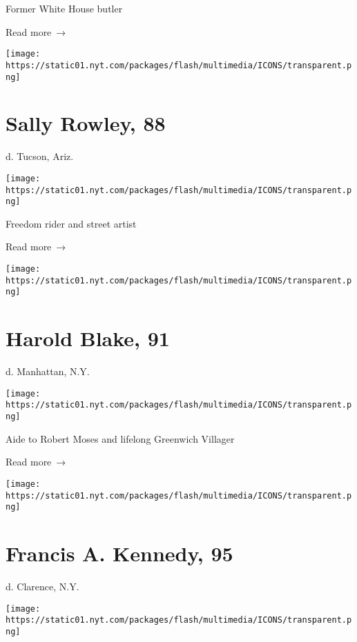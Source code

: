 Former White House butler

 Read more~→

\href{https://www.nytimes.com/2020/05/21/obituaries/sally-rowley-dead-coronavirus.html}{}

\texttt{[image: https://static01.nyt.com/packages/flash/multimedia/ICONS/transparent.png]}

\hypertarget{sally-rowley-88}{%
\section{Sally Rowley, 88}\label{sally-rowley-88}}

d. Tucson, Ariz.

\texttt{[image: https://static01.nyt.com/packages/flash/multimedia/ICONS/transparent.png]}

Freedom rider and street artist

 Read more~→

\href{https://www.nytimes.com/2020/05/21/nyregion/harold-blake-dead-coronavirus.html}{}

\texttt{[image: https://static01.nyt.com/packages/flash/multimedia/ICONS/transparent.png]}

\hypertarget{harold-blake-91}{%
\section{Harold Blake, 91}\label{harold-blake-91}}

d. Manhattan, N.Y.

\texttt{[image: https://static01.nyt.com/packages/flash/multimedia/ICONS/transparent.png]}

Aide to Robert Moses and lifelong Greenwich Villager

 Read more~→

\href{https://www.nytimes.com/2020/05/20/us/francis-a-kennedy-dead-coronavirus.html}{}

\texttt{[image: https://static01.nyt.com/packages/flash/multimedia/ICONS/transparent.png]}

\hypertarget{francis-a-kennedy-95}{%
\section{Francis A. Kennedy, 95}\label{francis-a-kennedy-95}}

d. Clarence, N.Y.

\texttt{[image: https://static01.nyt.com/packages/flash/multimedia/ICONS/transparent.png]}

